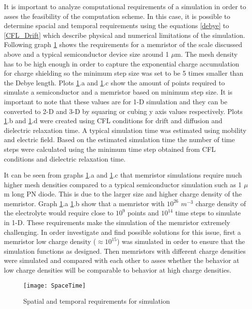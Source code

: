 {It is important to analyze computational requirements of a simulation in order to asses the feasibility of the computation scheme. In this case, it is possible to determine spacial and temporal requirements using the equations \ref{debye} to \ref{CFL_Drift} which describe physical and numerical limitations of the simulation. Following graph \ref{SpaceTime} shows the requirements for a memristor of the scale discussed above and a typical semiconductor device size around 1 $\mu$m. The mesh density has to be high enough in order to capture the exponential charge accumulation for charge shielding so the minimum step size was set to be 5 times smaller than the Debye length. Plots \ref{SpaceTime}.a and \ref{SpaceTime}.c show the amount of points required to simulate a semiconductor and a memristor based on minimum step size. It is important to note that these values are for 1-D simulation and they can be converted to 2-D and 3-D by squaring or cubing y axis values respectively. Plots \ref{SpaceTime}.b and \ref{SpaceTime}.d were created using CFL conditions for drift and diffusion and dielectric relaxation time. A typical simulation time was estimated using mobility and electric field. Based on the estimated simulation time the number of time steps were calculated using the minimum time step obtained from CFL conditions and dielectric relaxation time.

It can be seen from graphs \ref{SpaceTime}.a and \ref{SpaceTime}.c that memristor simulations require much higher mesh densities compared to a typical semiconductor simulation such as 1 $\mu$m long PN diode. This is due to the larger size and higher charge density of the memristor. Graph \ref{SpaceTime}.a \ref{SpaceTime}.b show that a memristor with $10^{26}$ $m^{-3}$ charge density of the electrolyte would require close to $10^9$ points and $10^{14}$ time steps to simulate in 1-D. These requirements make the simulation of the memristor extremely challenging. In order investigate and find possible solutions for this issue, first a memristor low charge density ($\approx 10^{15}$) was simulated in order to ensure that the simulation functions as designed. Then memristors with different charge densities were simulated and compared with each other to asses whether the behavior at low charge densities will be comparable to behavior at high charge densities.

\begin{landscape}
\begin{figure}[htp]
\centering
\texttt{[image: SpaceTime]}
\caption{Spatial and temporal requirements for simulation} 
\label{SpaceTime}
\end{figure}
\end{landscape}


}
